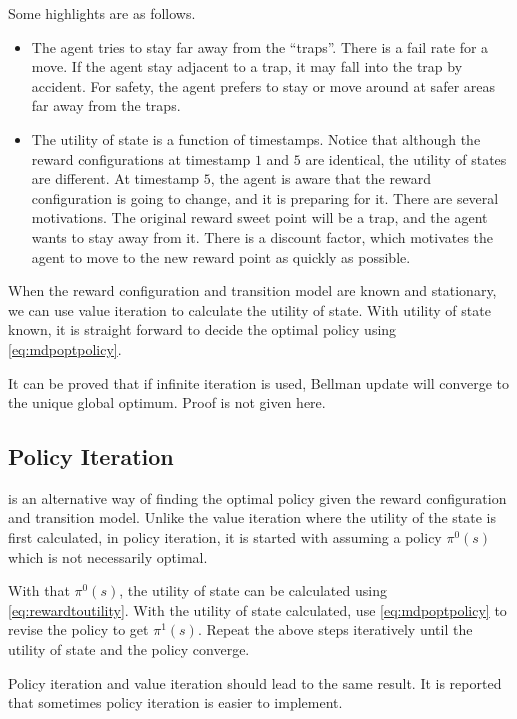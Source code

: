 Some highlights are as follows.
\begin{itemize}
	\item The agent tries to stay far away from the ``traps''. There is a fail rate for a move. If the agent stay adjacent to a trap, it may fall into the trap by accident. For safety, the agent prefers to stay or move around at safer areas far away from the traps.
	\item The utility of state is a function of timestamps. Notice that although the reward configurations at timestamp $1$ and $5$ are identical, the utility of states are different. At timestamp $5$, the agent is aware that the reward configuration is going to change, and it is preparing for it. There are several motivations. The original reward sweet point will be a trap, and the agent wants to stay away from it. There is a discount factor, which motivates the agent to move to the new reward point as quickly as possible.
\end{itemize}

When the reward configuration and transition model are known and stationary, we can use value iteration to calculate the utility of state. With utility of state known, it is straight forward to decide the optimal policy using \eqref{eq:mdpoptpolicy}.

It can be proved that if infinite iteration is used, Bellman update will converge to the unique global optimum. Proof is not given here.

\subsection{Policy Iteration}

 is an alternative way of finding the optimal policy given the reward configuration and transition model. Unlike the value iteration where the utility of the state is first calculated, in policy iteration, it is started with assuming a policy $\pi^0(s)$ which is not necessarily optimal.

With that $\pi^0(s)$, the utility of state can be calculated using \eqref{eq:rewardtoutility}. With the utility of state calculated, use \eqref{eq:mdpoptpolicy} to revise the policy to get $\pi^1(s)$. Repeat the above steps iteratively until the utility of state and the policy converge.

Policy iteration and value iteration should lead to the same result. It is reported that sometimes policy iteration is easier to implement.

